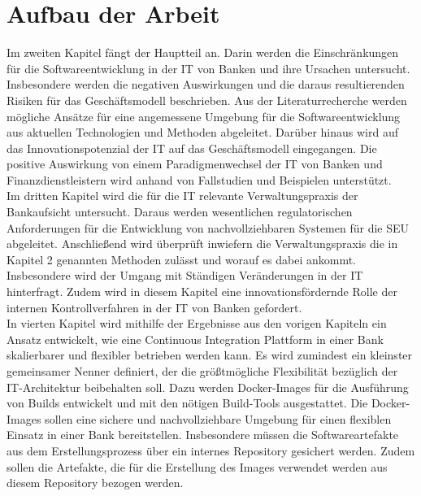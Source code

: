 \section{Aufbau der Arbeit}
\label{sec:intro:structure}
Im zweiten Kapitel fängt der Hauptteil an. Darin werden die Einschränkungen für die Softwareentwicklung in der IT von Banken und ihre Ursachen untersucht. Insbesondere werden die negativen Auswirkungen und die daraus resultierenden Risiken für das Geschäftsmodell beschrieben. Aus der Literaturrecherche werden mögliche Ansätze für eine angemessene Umgebung für die Softwareentwicklung aus aktuellen Technologien und Methoden abgeleitet. Darüber hinaus wird auf das Innovationspotenzial der IT auf das Geschäftsmodell eingegangen. Die positive Auswirkung von einem Paradigmenwechsel der IT von Banken und Finanzdienstleistern wird anhand von Fallstudien und Beispielen unterstützt.
\medskip
\\
Im dritten Kapitel wird die für die IT relevante Verwaltungspraxis der Bankaufsicht untersucht. Daraus werden wesentlichen regulatorischen Anforderungen für die Entwicklung von nachvollziehbaren Systemen für die \ac{SEU} abgeleitet. Anschließend wird überprüft inwiefern die Verwaltungspraxis die in Kapitel 2 genannten Methoden zulässt und worauf es dabei ankommt. Insbesondere wird der Umgang mit Ständigen Veränderungen in der IT hinterfragt. Zudem wird in diesem Kapitel eine innovationsfördernde Rolle der internen Kontrollverfahren in der IT von Banken gefordert.
\medskip
\\
In vierten Kapitel wird mithilfe der Ergebnisse aus den vorigen Kapiteln ein Ansatz entwickelt, wie eine Continuous Integration Plattform in einer Bank skalierbarer und flexibler betrieben werden kann. Es wird zumindest ein kleinster gemeinsamer Nenner definiert, der die größtmögliche Flexibilität bezüglich der IT-Architektur beibehalten soll. Dazu werden Docker-Images für die Ausführung von Builds entwickelt und mit den nötigen Build-Tools ausgestattet. Die Docker-Images sollen eine sichere und nachvollziehbare Umgebung für einen flexiblen Einsatz in einer Bank bereitstellen. Insbesondere müssen die Softwareartefakte aus dem Erstellungsprozess über ein internes Repository gesichert werden. Zudem sollen die Artefakte, die für die Erstellung des Images verwendet werden aus diesem Repository bezogen werden. 